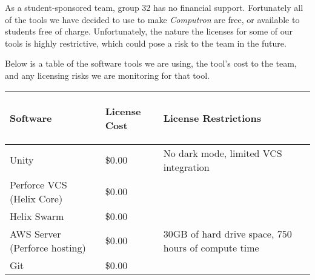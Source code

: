 As a student-sponsored team, group 32 has no financial support. Fortunately all of the tools we have decided to use to make \textit{Computron} are free, or available to students free of charge. Unfortunately, the nature the licenses for some of our tools is highly restrictive, which could pose a risk to the team in the future.

Below is a table of the software tools we are using, the tool's cost to the team, and any licensing risks we are monitoring for that tool. 
\begin{center}
    \begin{tabular}{ | m{5cm} | m{4cm} | m{5cm} |} 
        \hline
            \begin{center}
                \textbf{Software}
            \end{center} & 
            \begin{center}
                \textbf{License Cost}
            \end{center} & 
            \begin{center}
                \textbf{License Restrictions}
            \end{center}\\
        \hline
            Unity & 
            \$0.00 & 
            No dark mode, limited VCS integration\\
        \hline
            Perforce VCS (Helix Core) & 
            \$0.00 & 
            \\
        \hline
            Helix Swarm & 
            \$0.00 & 
            \\
        \hline
            AWS Server (Perforce hosting) & 
            \$0.00 & 
            30GB of hard drive space, 750 hours of compute time\\
        \hline
            Git & 
            \$0.00 & 
            \\
        \hline
    \end{tabular}
\end{center}
